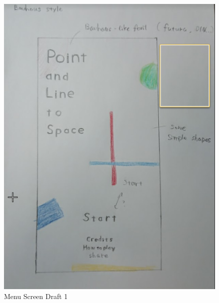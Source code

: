 \begin{figure}[htbp]
	\centering
		\includegraphics[width=1.00\textwidth]{img/Menu1.png}
	\caption[Menu Screen Draft 1]{Menu Screen Draft 1}
	\label{fig:Menu1}
\end{figure}
